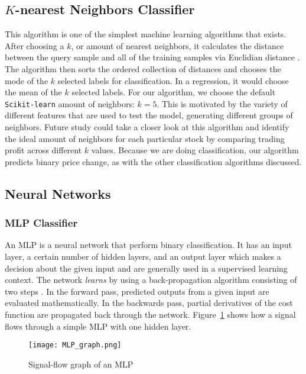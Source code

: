 \documentclass[../thesis.tex]{subfiles}
\begin{document}
\subsection{$K$-nearest Neighbors Classifier}

This algorithm is one of the simplest machine learning algorithms that exists. After choosing a $k$, or amount of nearest neighbors, it calculates the distance between the query sample and all of the training samples via Euclidian distance \cite{PedregosaFABIANPEDREGOSA2011}. The algorithm then sorts the ordered collection of distances and chooses the mode of the $k$ selected labels for classification. In a regression, it would choose the mean of the $k$ selected labels. For our  algorithm, we choose the default \texttt{Scikit-learn} amount of neighbors: $k=5$. This is motivated by the variety of different features that are used to test the model, generating different groups of neighbors. Future study could take a closer look at this algorithm and identify the ideal amount of neighbors for each particular stock by comparing trading profit across different $k$ values. Because we are doing classification, our algorithm predicts binary price change, as with the other classification algorithms discussed. 

\subsection{Neural Networks}

\subsubsection{MLP Classifier}
An MLP is a neural network that perform binary classification. It has an input layer, a certain number of hidden layers, and an output layer which makes a decision about the given input and are generally used in a supervised learning context. The network \textit{learns} by using a back-propagation algorithm consisting of two steps \cite{Honkela2001}. In the forward pass, predicted outputs from a given input are evaluated mathematically. In the backwards pass, partial derivatives of the cost function are propagated back through the network. Figure~\ref{MLPgraph} shows how a signal flows through a simple MLP with one hidden layer. 

\begin{figure}[h]
\centering
\texttt{[image: MLP\_graph.png]}
\caption{Signal-flow graph of an MLP \label{overflow}}
\label{MLPgraph}
\end{figure}
\end{document}

